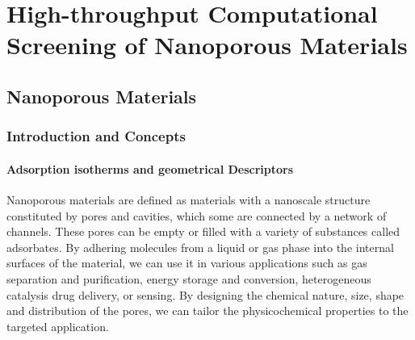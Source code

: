 \documentclass[main.tex]{subfiles}
\begin{document}
\chapter{High-throughput Computational Screening of Nanoporous Materials}
\vspace*{-1\baselineskip}

\section{Nanoporous Materials}

\subsection{Introduction and Concepts}

\subsubsection{Adsorption isotherms and geometrical Descriptors}

Nanoporous materials are defined as materials with a nanoscale structure constituted by pores and cavities, which some are connected by a network of channels. These pores can be empty or filled with a variety of substances called adsorbates. By adhering molecules from a liquid or gas phase into the internal surfaces of the material, we can use it in various applications such as gas separation and purification,\cite{Li_2009,Lagorsse_2007} energy storage and conversion,\cite{Morris_2008,Qiu_2020} heterogeneous catalysis\cite{Bell_2003,Singh_2019,Pascanu_2019} drug delivery,\cite{Della_Rocca_2011,Bernini_2014} or sensing.\cite{Breslin_1976} By designing the chemical nature, size, shape and distribution of the pores, we can tailor the physicochemical properties to the targeted application.\cite{Yan_2020}
\end{document}
